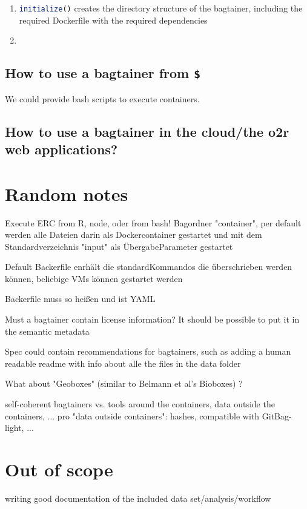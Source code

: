 \documentclass[twoside,a4paper]{refart}
\def\inliner{\lstinline[basicstyle=\ttfamily,language=R,keywordstyle={}]} % http://tex.stackexchange.com/questions/44702/can-you-change-lstinline-without-changing-the-global-lstset
\begin{document}
\begin{enumerate}
    \item \colorbox{codebg}{\inliner{initialize()}} creates the directory structure of the bagtainer, including the required Dockerfile with the required dependencies
    \item 
\end{enumerate}

\subsection{How to use a bagtainer from \texttt{\$}}

We could provide bash scripts to execute containers.

\subsection{How to use a bagtainer in the cloud/the o2r web applications?}


\section{Random notes}

Execute ERC from R, node, oder from bash!
Bagordner "container", per default werden alle Dateien darin als Dockercontainer gestartet und mit dem Standardverzeichnis "input" als ÜbergabeParameter gestartet

Default Backerfile enrhält die standardKommandos die überschrieben werden können, beliebige VMs können gestartet werden

Backerfile muss so heißen und ist YAML

Must a bagtainer contain license information? It should be possible to put it in the semantic metadata

Spec could contain recommendations for bagtainers, such as adding a human readable readme with info about alle the files in the data folder

What about "Geoboxes" (similar to Belmann et al's Bioboxes) ?

self-coherent bagtainers vs. tools around the containers, data outside the containers, ...
pro "data outside containers": hashes, compatible with GitBag-light, ...
 

\section{Out of scope}

writing good documentation of the included data set/analysis/workflow
\end{document}
